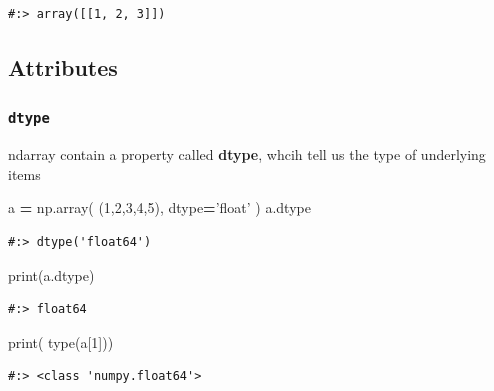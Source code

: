 \documentclass[
]{book}
\newenvironment{Shaded}{\begin{snugshade}}{\end{snugshade}}
\newcommand{\BuiltInTok}[1]{#1}
\newcommand{\DecValTok}[1]{\textcolor[rgb]{0.06,0.06,0.06}{#1}}
\newcommand{\NormalTok}[1]{#1}
\newcommand{\OperatorTok}[1]{\textcolor[rgb]{0.43,0.43,0.43}{\textbf{#1}}}
\newcommand{\StringTok}[1]{\textcolor[rgb]{0.5,0.5,0.5}{#1}}
\begin{document}
\begin{verbatim}
#:> array([[1, 2, 3]])
\end{verbatim}

\hypertarget{attributes-3}{%
\subsection{Attributes}\label{attributes-3}}

\hypertarget{dtype}{%
\subsubsection{\texorpdfstring{\texttt{dtype}}{dtype}}\label{dtype}}

ndarray contain a property called \textbf{dtype}, whcih tell us the type of underlying items

\begin{Shaded}
\begin{Highlighting}[]
\NormalTok{a }\OperatorTok{=}\NormalTok{ np.array( (}\DecValTok{1}\NormalTok{,}\DecValTok{2}\NormalTok{,}\DecValTok{3}\NormalTok{,}\DecValTok{4}\NormalTok{,}\DecValTok{5}\NormalTok{), dtype}\OperatorTok{=}\StringTok{'float'}\NormalTok{ )}
\NormalTok{a.dtype}
\end{Highlighting}
\end{Shaded}

\begin{verbatim}
#:> dtype('float64')
\end{verbatim}

\begin{Shaded}
\begin{Highlighting}[]
\BuiltInTok{print}\NormalTok{(a.dtype)}
\end{Highlighting}
\end{Shaded}

\begin{verbatim}
#:> float64
\end{verbatim}

\begin{Shaded}
\begin{Highlighting}[]
\BuiltInTok{print}\NormalTok{( }\BuiltInTok{type}\NormalTok{(a[}\DecValTok{1}\NormalTok{]))}
\end{Highlighting}
\end{Shaded}

\begin{verbatim}
#:> <class 'numpy.float64'>
\end{verbatim}
\end{document}
